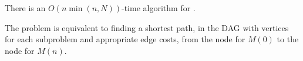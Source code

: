 \begin{theorem}
  There is an $O(n\min(n, N))$-time algorithm for .
\end{theorem}

The problem is equivalent to finding a shortest path, in the DAG
with vertices for each subproblem and appropriate edge costs,
from the node for $M(0)$ to the node for $M(n)$.







  

